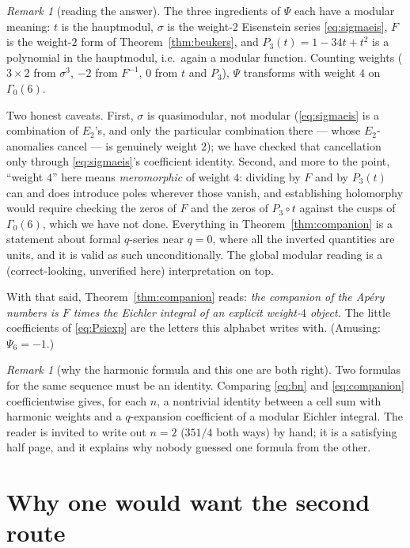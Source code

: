 \documentclass[11pt,reqno]{amsart}
\theoremstyle{plain}
\theoremstyle{definition}
\theoremstyle{remark}
\newtheorem{remark}[theorem]{Remark}
\numberwithin{equation}{section}
\begin{document}
\begin{remark}[reading the answer]
The three ingredients of $\Psi$ each have a modular meaning: $t$ is the
hauptmodul, $\sigma$ is the weight-$2$ Eisenstein series \eqref{eq:sigmaeis},
$F$ is the weight-$2$ form of Theorem~\ref{thm:beukers}, and
$P_3(t)=1-34t+t^2$ is a polynomial in the hauptmodul, i.e.\ again a modular
function. Counting weights ($3\times2$ from $\sigma^3$, $-2$ from $F^{-1}$, $0$
from $t$ and $P_3$), $\Psi$ transforms with weight $4$ on $\Gamma_0(6)$.

Two honest caveats. First, $\sigma$ is quasimodular, not modular
(\eqref{eq:sigmaeis} is a combination of $E_2$'s, and only the particular
combination there --- whose $E_2$-anomalies cancel --- is genuinely weight $2$);
we have checked that cancellation only through \eqref{eq:sigmaeis}'s coefficient
identity. Second, and more to the point, ``weight $4$'' here means
\emph{meromorphic} of weight $4$: dividing by $F$ and by $P_3(t)$ can and does
introduce poles wherever those vanish, and establishing holomorphy would require
checking the zeros of $F$ and the zeros of $P_3\circ t$ against the cusps of
$\Gamma_0(6)$, which we have not done. Everything in
Theorem~\ref{thm:companion} is a statement about formal $q$-series near $q=0$,
where all the inverted quantities are units, and it is valid as such
unconditionally. The global modular reading is a (correct-looking, unverified
here) interpretation on top.

With that said, Theorem~\ref{thm:companion} reads: \emph{the companion of the
Ap\'ery numbers is $F$ times the Eichler integral of an explicit weight-$4$
object.} The little coefficients of \eqref{eq:Psiexp} are
the letters this alphabet writes with. (Amusing: $\Psi_6=-1$.)
\end{remark}

\begin{remark}[why the harmonic formula and this one are both right]
Two formulas for the same sequence must be an identity. Comparing
\eqref{eq:bn} and \eqref{eq:companion} coefficientwise gives, for each $n$, a
nontrivial identity between a cell sum with harmonic weights and a
$q$-expansion coefficient of a modular Eichler integral. The reader is invited
to write out $n=2$ ($351/4$ both ways) by hand; it is a satisfying half page,
and it explains why nobody guessed one formula from the other.
\end{remark}

\section{Why one would want the second route}\label{sec:why}
\end{document}
